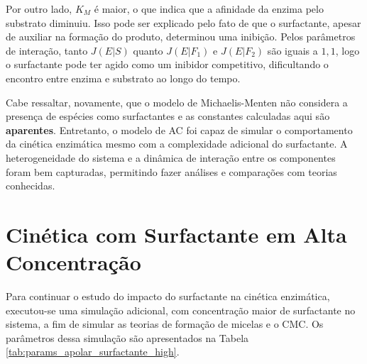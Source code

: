 \documentclass[12pt,oneside]{report}
\begin{document}
Por outro lado, $K_M$ é maior, o que indica que a afinidade da enzima pelo substrato diminuiu. Isso pode ser explicado pelo fato de que o surfactante, apesar de auxiliar na formação do produto, determinou uma inibição. Pelos parâmetros de interação, tanto $J (E|S)$ quanto $J (E|F_1)$ e $J (E|F_2)$ são iguais a $1{,}1$, logo o surfactante pode ter
agido como um inibidor competitivo, dificultando o encontro entre enzima e substrato ao longo do tempo.

Cabe ressaltar, novamente, que o modelo de Michaelis-Menten não considera a presença de espécies como surfactantes e as constantes calculadas aqui são \textbf{aparentes}. Entretanto, o modelo de AC foi capaz de simular o comportamento da cinética enzimática mesmo com a complexidade adicional do surfactante. A heterogeneidade do sistema e a dinâmica de interação entre os componentes foram bem capturadas, permitindo fazer análises e comparações com teorias conhecidas.

\section{Cinética com Surfactante em Alta Concentração}

Para continuar o estudo do impacto do surfactante na cinética enzimática, executou-se uma simulação adicional, com concentração maior de surfactante no sistema, a fim de simular as teorias de formação de micelas e o CMC. Os parâmetros dessa simulação são apresentados na Tabela \ref{tab:params_apolar_surfactante_high}.
\end{document}
